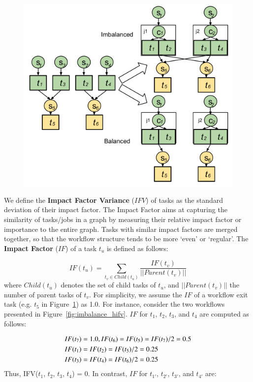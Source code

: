 \begin{figure}[htb]
	\centering
	\includegraphics[width=\linewidth]{figures/imbalance/dv.pdf}
	\label{fig:imbalance_dv}
\end{figure}

We define the \textbf{Impact Factor Variance} ($IFV$) of tasks as the standard deviation of their impact factor. The Impact Factor aims at capturing the similarity of tasks/jobs in a graph by measuring their relative impact factor or importance to the entire graph. Tasks with similar impact factors are merged together, so that the workflow structure tends to be more `even' or `regular'. The \textbf{Impact Factor} ($IF$) of a task $t_u$ is defined as follows:

\begin{equation}
\label{eq:imbalance_impact_factor}
	IF(t_u)=\sum_{t_v\in Child(t_u)}^{}\frac{IF(t_v)}{||Parent(t_v)||}
\end{equation}
where $Child(t_u)$ denotes the set of child tasks of $t_u$, and $||Parent(t_v)||$ the number of parent tasks of $t_v$. For simplicity, we assume the $IF$ of a workflow exit task (e.g. $t_5$ in Figure~\ref{fig:imbalance_dv}) as 1.0. For instance, consider the two workflows presented in Figure~\ref{fig:imbalance_hifv}. $IF$ for $t_1$, $t_2$, $t_3$, and $t_4$ are computed as follows:

\begin{eqnarray}
	\displaystyle  
	&IF(t_7 )=1.0, IF(t_6 )=IF(t_5 )=IF(t_7 )/2=0.5\nonumber  \\
	&IF(t_1 )=IF(t_2 )=IF(t_5 )/2=0.25\nonumber \\
	&IF(t_3 )=IF(t_4 )=IF(t_6 )/2=0.25\nonumber 
\end{eqnarray}
Thus, IFV($t_1$, $t_2$, $t_3$, $t_4$) = 0. In contrast, $IF$ for $t_{1'}$, $t_{2'}$, $t_{3'}$, and $t_{4'}$ are:

